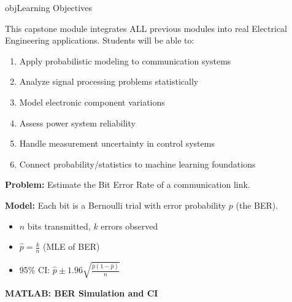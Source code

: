 \begin{PSbox}[unbreakable]{obj}{Learning Objectives}

This capstone module integrates ALL previous modules into real Electrical Engineering applications. Students will be able to:

\begin{enumerate}
\def\labelenumi{\arabic{enumi}.}
\tightlist
\item
  Apply probabilistic modeling to communication systems
\item
  Analyze signal processing problems statistically
\item
  Model electronic component variations
\item
  Assess power system reliability
\item
  Handle measurement uncertainty in control systems
\item
  Connect probability/statistics to machine learning foundations
\end{enumerate}

\end{PSbox}



\textbf{Problem:} Estimate the Bit Error Rate of a communication link.

\textbf{Model:} Each bit is a Bernoulli trial with error probability $p$ (the BER).

\begin{itemize}
\tightlist
\item
  $n$ bits transmitted, $k$ errors observed
\item
  $\hat{p} = \frac{k}{n}$ (MLE of BER)
\item
  95\% CI: $\hat{p} \pm 1.96\sqrt{\frac{\hat{p}(1-\hat{p})}{n}}$
\end{itemize}

\textbf{MATLAB: BER Simulation and CI}


